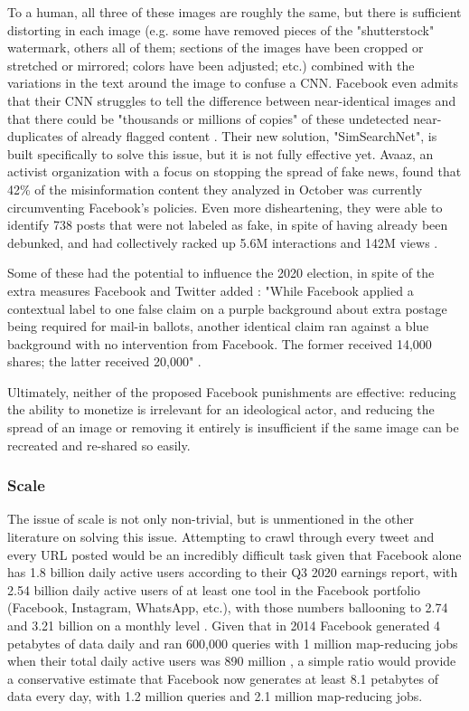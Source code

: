 \documentclass[preprint,review,12pt]{elsarticle}
\begin{document}
To a human, all three of these images are roughly the same, but there is sufficient distorting in each image (e.g. some have removed pieces of the "shutterstock" watermark, others all of them; sections of the images have been cropped or stretched or mirrored; colors have been adjusted; etc.) combined with the variations in the text around the image to confuse a CNN. Facebook even admits that their CNN struggles to tell the difference between near-identical images and that there could be "thousands or millions of copies" of these undetected near-duplicates of already flagged content \cite{sumbaly2020using}. Their new solution, "SimSearchNet", is built specifically to solve this issue, but it is not fully effective yet. Avaaz, an activist organization with a focus on stopping the spread of fake news, found that 42\% of the misinformation content they analyzed in October was currently circumventing Facebook's policies. Even more disheartening, they were able to identify 738 posts that were not labeled as fake, in spite of having already been debunked, and had collectively racked up 5.6M interactions and 142M views \cite{schott2020brief}.

Some of these had the potential to influence the 2020 election, in spite of the extra measures Facebook and Twitter added \cite{dean2020facebook}: "While Facebook applied a contextual label to one false claim on a purple background about extra postage being required for mail-in ballots, another identical claim ran against a blue background with no intervention from Facebook. The former received 14,000 shares; the latter received 20,000" \cite{Fung2020facebook}.

Ultimately, neither of the proposed Facebook punishments are effective: reducing the ability to monetize is irrelevant for an ideological actor, and reducing the spread of an image or removing it entirely is insufficient if the same image can be recreated and re-shared so easily.

\subsubsection{Scale}
\label{Scale Section}
The issue of scale is not only non-trivial, but is unmentioned in the other literature on solving this issue. Attempting to crawl through every tweet and every URL posted would be an incredibly difficult task given that Facebook alone has 1.8 billion daily active users according to their Q3 2020 earnings report, with 2.54 billion daily active users of at least one tool in the Facebook portfolio (Facebook, Instagram, WhatsApp, etc.), with those numbers ballooning to 2.74 and 3.21 billion on a monthly level \cite{facebook2020q3}. Given that in 2014 Facebook generated 4 petabytes of data daily and ran 600,000 queries with 1 million map-reducing jobs when their total daily active users was 890 million \cite{bronson2015open}, a simple ratio would provide a conservative estimate that Facebook now generates at least 8.1 petabytes of data every day, with 1.2 million queries and 2.1 million map-reducing jobs. 
\end{document}
